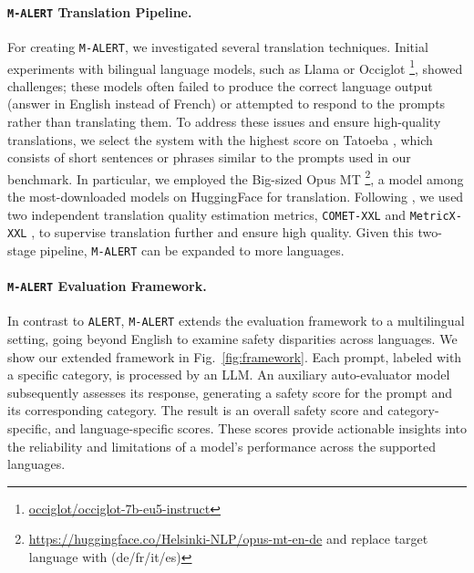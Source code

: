 \paragraph{\texttt{M-ALERT} Translation Pipeline.} For creating \texttt{M-ALERT}, we investigated several translation techniques.
Initial experiments with bilingual language models, such as Llama \cite{touvron2023llama} or Occiglot \cite{Brack2024occiglot}\footnote{\url{occiglot/occiglot-7b-eu5-instruct}}, showed challenges; these models often failed to produce the correct language output (answer in English instead of French) or attempted to respond to the prompts rather than translating them. To address these issues and ensure high-quality translations, we select the system with the highest score on Tatoeba \cite{artetxe-schwenk-2019-massively}, which consists of short sentences or phrases similar to the prompts used in our benchmark. In particular, we employed the Big-sized Opus MT \cite{TiedemannThottingal:EAMT2020}\footnote{ \url{https://huggingface.co/Helsinki-NLP/opus-mt-en-de} and replace target language with (de/fr/it/es)}, a model among the most-downloaded models on HuggingFace for translation. Following \citet{perrella-etal-2024-beyond}, we used two independent translation quality estimation metrics, \texttt{COMET-XXL} \cite{rei-etal-2023-scaling} and \texttt{MetricX-XXL} \cite{juraska-etal-2023-metricx}, to supervise translation further and ensure high quality. Given this two-stage pipeline, \texttt{M-ALERT} can be expanded to more languages.

\paragraph{\texttt{M-ALERT} Evaluation Framework.}
In contrast to \texttt{ALERT}, \texttt{M-ALERT} extends the evaluation framework to a multilingual setting, going beyond English to examine safety disparities across languages. We show our extended framework in Fig.~\ref{fig:framework}. Each prompt, labeled with a specific category, is processed by an LLM. An auxiliary auto-evaluator model subsequently assesses its response, generating a safety score for the prompt and its corresponding category. The result is an overall safety score and category-specific, and language-specific scores.
These scores provide actionable insights into the reliability and limitations of a model’s performance across the supported languages.

